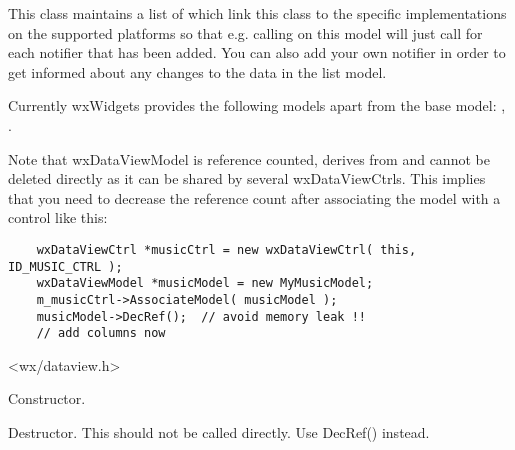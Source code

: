 This class maintains a list of 
which link this class to the specific implementations on the
supported platforms so that e.g. calling 
on this model will just call 
for each notifier that has been added. You can also add 
your own notifier in order to get informed about any changes 
to the data in the list model.

Currently wxWidgets provides the following models apart
from the base model: 
,
.

Note that wxDataViewModel is reference counted, derives from 
 and cannot be deleted
directly as it can be shared by several wxDataViewCtrls. This
implies that you need to decrease the reference count after
associating the model with a control like this:

{\small%
\begin{verbatim}
    wxDataViewCtrl *musicCtrl = new wxDataViewCtrl( this, ID_MUSIC_CTRL );
    wxDataViewModel *musicModel = new MyMusicModel;
    m_musicCtrl->AssociateModel( musicModel );
    musicModel->DecRef();  // avoid memory leak !!
    // add columns now
\end{verbatim}
}%




<wx/dataview.h>







\label{wxdataviewmodelwxdataviewmodel}


Constructor.


\label{wxdataviewmodeldtor}


Destructor. This should not be called directly. Use DecRef() instead.



